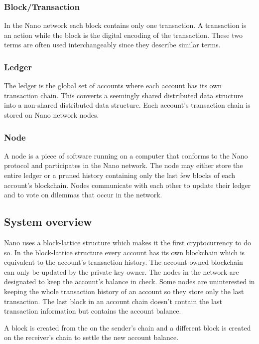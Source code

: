 \documentclass{ferseminar}
\begin{document}
\subsubsection{Block/Transaction}
In the Nano network each block contains only one transaction. A transaction is an action while the block is the digital encoding of the transaction. These two terms are often used interchangeably since they describe similar terms.

\subsubsection{Ledger}
The ledger is the global set of accounts where each account has its own transaction chain. This converts a seemingly shared distributed data structure into a non-shared distributed data structure. Each account's transaction chain is stored on Nano network nodes.

\subsubsection{Node}
A node is a piece of software running on a computer that conforms to the Nano protocol and participates in the Nano network. The node may either store the entire ledger or a pruned history containing only the last few blocks of each account's blockchain. Nodes communicate with each other to update their ledger and to vote on dilemmas that occur in the network.

\subsection{System overview}

Nano uses a block-lattice structure which makes it the first cryptocurrency to do so. In the block-lattice structure every account has its own blockchain which is equivalent to the account's transaction history. The account-owned blockchain can only be updated by the private key owner. The nodes in the network are designated to keep the account's balance in check. Some nodes are uninterested in keeping the whole transaction history of an account so they store only the last transaction. The last block in an account chain doesn't contain the last transaction information but contains the account balance.

A block is created from the on the sender's chain and a different block is created on the receiver's chain to settle the new account balance.
\end{document}
